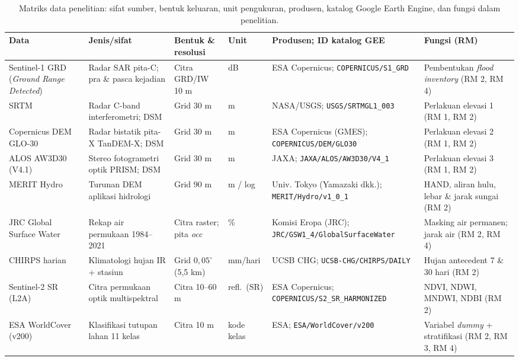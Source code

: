 \documentclass[12pt,a4paper]{article}
\newenvironment{adjustbox}[1]{%
  \begin{lrbox}{\adjboxtemp}%
}{%
  \end{lrbox}%
  \ifdim\wd\adjboxtemp>\textwidth
    \resizebox{\textwidth}{!}{\usebox{\adjboxtemp}}%
  \else
    \usebox{\adjboxtemp}%
  \fi
}
\begin{document}
\begin{table}[!htbp]
\centering
\caption[Matriks data penelitian]{Matriks data penelitian: sifat sumber, bentuk keluaran, unit
pengukuran, produsen, katalog Google Earth Engine, dan fungsi dalam
penelitian.}
\label{tab:data}
\small
\begin{adjustbox}{max width=\textwidth}
\begin{tabular}{>{\raggedright}p{2.5cm}>{\raggedright}p{2.5cm}>{\raggedright}p{1.55cm}>{\raggedright}p{1.4cm}>{\raggedright}p{3.55cm}>{\raggedright\arraybackslash}p{2.2cm}}
\toprule
\textbf{Data} & \textbf{Jenis/sifat} & \textbf{Bentuk \& resolusi} & \textbf{Unit} & \textbf{Produsen; ID katalog GEE} & \textbf{Fungsi (RM)} \\
\midrule
Sentinel-1 GRD (\textit{Ground Range Detected}) & Radar SAR pita-C; pra \& pasca kejadian & Citra GRD/IW 10 m & dB & ESA Copernicus; \texttt{COPERNICUS/\allowbreak S1\_GRD} & Pembentukan \textit{flood inventory} (RM 2, RM 4) \\
SRTM & Radar C-band interferometri; DSM & Grid 30 m & m & NASA/USGS; \texttt{USGS/\allowbreak SRTMGL1\_003} & Perlakuan elevasi 1 (RM 1, RM 2) \\
Copernicus DEM GLO-30 & Radar bistatik pita-X TanDEM-X; DSM & Grid 30 m & m & ESA Copernicus (GMES); \texttt{COPERNICUS/\allowbreak DEM/\allowbreak GLO30} & Perlakuan elevasi 2 (RM 1, RM 2) \\
ALOS AW3D30 (V4.1) & Stereo fotogrametri optik PRISM; DSM & Grid 30 m & m & JAXA; \texttt{JAXA/\allowbreak ALOS/\allowbreak AW3D30/\allowbreak V4\_1} & Perlakuan elevasi 3 (RM 1, RM 2) \\
MERIT Hydro & Turunan DEM aplikasi hidrologi & Grid 90 m & m / log & Univ. Tokyo (Yamazaki dkk.); \texttt{MERIT/\allowbreak Hydro/\allowbreak v1\_0\_1} & HAND, aliran hulu, lebar \& jarak sungai (RM 2) \\
JRC Global Surface Water & Rekap air permukaan 1984--2021 & Citra raster; pita \textit{occ} & \% & Komisi Eropa (JRC); \texttt{JRC/\allowbreak GSW1\_4/\allowbreak GlobalSurfaceWater} & Masking air permanen; jarak air (RM 2, RM 4) \\
CHIRPS harian & Klimatologi hujan IR + stasiun & Grid $0{,}05^{\circ}$ (5,5 km) & mm/hari & UCSB CHG; \texttt{UCSB-CHG/\allowbreak CHIRPS/\allowbreak DAILY} & Hujan antecedent 7 \& 30 hari (RM 2) \\
Sentinel-2 SR (L2A) & Citra permukaan optik multispektral & Citra 10--60 m & refl.\ (SR) & ESA Copernicus; \texttt{COPERNICUS/\allowbreak S2\_SR\_HARMONIZED} & NDVI, NDWI, MNDWI, NDBI (RM 2) \\
ESA WorldCover (v200) & Klasifikasi tutupan lahan 11 kelas & Citra 10 m & kode kelas & ESA; \texttt{ESA/\allowbreak WorldCover/\allowbreak v200} & Variabel \textit{dummy} + stratifikasi (RM 2, RM 3, RM 4) \\
\bottomrule
\end{tabular}
\end{adjustbox}
\end{table}
\end{document}
